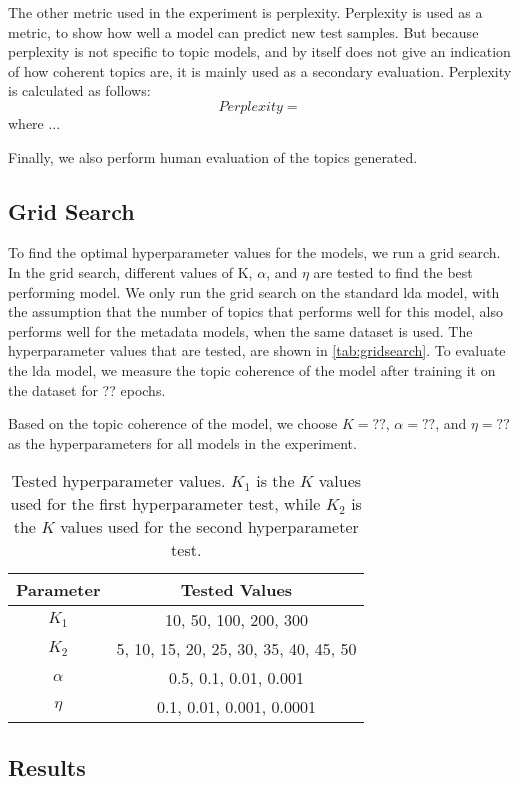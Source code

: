 The other metric used in the experiment is perplexity.
Perplexity is used as a metric, to show how well a model can predict new test samples.
But because perplexity is not specific to topic models, and by itself does not give an indication of how coherent topics are, it is mainly used as a secondary evaluation.
Perplexity is calculated as follows:
\begin{equation}
	Perplexity = 
\end{equation}
\noindent where ...

Finally, we also perform human evaluation of the topics generated.

\subsection{Grid Search}\label{sec:experiment_gridsearch}
To find the optimal hyperparameter values for the models, we run a grid search.
In the grid search, different values of K, $\alpha$, and $\eta$ are tested to find the best performing model.
We only run the grid search on the standard \gls{lda} model, with the assumption that the number of topics that performs well for this model, also performs well for the metadata models, when the same dataset is used.
The hyperparameter values that are tested, are shown in \autoref{tab:gridsearch}.
To evaluate the \gls{lda} model, we measure the topic coherence of the model after training it on the dataset for ?? epochs.

Based on the topic coherence of the model, we choose $K = ??$, $\alpha = ??$, and $\eta = ??$ as the hyperparameters for all models in the experiment.

\begin{table}[h]
	\centering
	\caption{Tested hyperparameter values. $K_1$ is the $K$ values used for the first hyperparameter test, while $K_2$ is the $K$ values used for the second hyperparameter test.}
	\begin{tabular}{c|c}
		Parameter & Tested Values\\
		\midrule
		$K_1$ & 10, 50, 100, 200, 300\\
		$K_2$ & 5, 10, 15, 20, 25, 30, 35, 40, 45, 50\\
		$\alpha$ & 0.5, 0.1, 0.01, 0.001\\
		$\eta$ & 0.1, 0.01, 0.001, 0.0001\\
	\end{tabular}
	\label{tab:gridsearch}
\end{table}

\subsection{Results}\label{sec:results}
